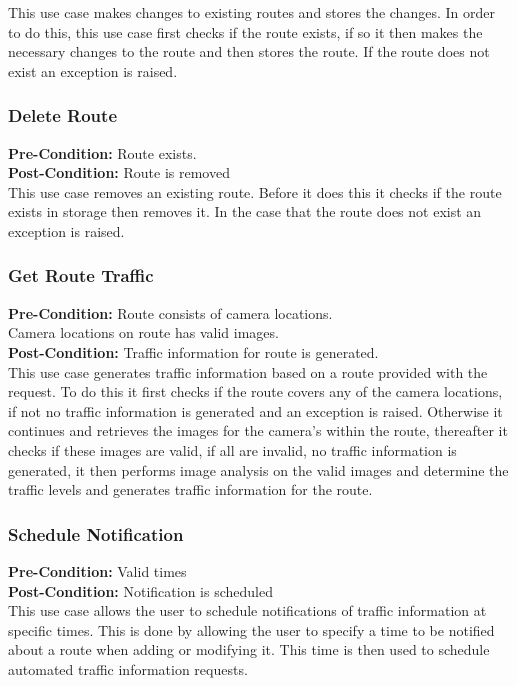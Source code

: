 \documentclass[a4paper,12pt]{article}
\begin{document}
This use case makes changes to existing routes and stores the changes. In order to do this, this use case first checks if the route exists, if so it then makes the necessary changes to the route and then stores the route. If the route does not exist an exception is raised. 
\subsubsection{Delete Route}
\textbf{Pre-Condition: }
Route exists.\\
\textbf{Post-Condition: }
Route is removed\\
This use case removes an existing route. Before it does this it checks if the route exists in storage then removes it. In the case that the route does not exist an exception is raised.
\subsubsection{Get Route Traffic}
\textbf{Pre-Condition: }
Route consists of camera locations.\\
Camera locations on route has valid images.\\
\textbf{Post-Condition: }
Traffic information for route is generated.\\

This use case generates traffic information based on a route provided with the request. To do this it first checks if the route covers any of the camera locations, if not no traffic information is generated and an exception is raised. Otherwise it continues and retrieves the images for the camera's within the route, thereafter it checks if these images are valid, if all are invalid, no traffic information is generated, it then performs image analysis on the valid images and determine the traffic levels and generates traffic information for the route.

\subsubsection{Schedule Notification}
\textbf{Pre-Condition: }
Valid times\\
\textbf{Post-Condition: }
Notification is scheduled\\

This use case allows the user to schedule notifications of traffic information at specific times. This is done by allowing the user to specify a time to be notified about a route when adding or modifying it. This time is then used to schedule automated traffic information requests.
\end{document}
